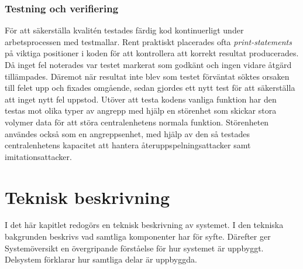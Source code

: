 \documentclass{article}
\begin{document}
\subsubsection{Testning och verifiering}
För att säkerställa kvalitén testades färdig kod kontinuerligt under arbetsprocessen med testmallar.
Rent praktiskt placerades ofta \emph{print-statements} på viktiga positioner i koden för att kontrollera att korrekt resultat producerades.
Då inget fel noterades var testet markerat som godkänt och ingen vidare åtgärd tillämpades. 
Däremot när resultat inte blev som testet förväntat söktes orsaken till felet upp och fixades omgående, sedan gjordes ett nytt test för att säkerställa att inget nytt fel uppstod.
Utöver att testa kodens vanliga funktion har den testas mot olika typer av angrepp med hjälp en störenhet som skickar stora volymer data för att störa centralenhetens normala funktion. 
Störenheten användes också som en angreppsenhet, med hjälp av den så testades centralenhetens kapacitet att hantera återuppspelningsattacker samt imitationsattacker.

\section{Teknisk beskrivning}
I det här kapitlet redogörs en teknisk beskrivning av systemet. 
I den tekniska bakgrunden beskrivs vad samtliga komponenter har för syfte. Därefter ger Systemöversikt en övergripande förståelse för hur systemet är uppbyggt. 
Delsystem förklarar hur samtliga delar är uppbyggda.
\end{document}
